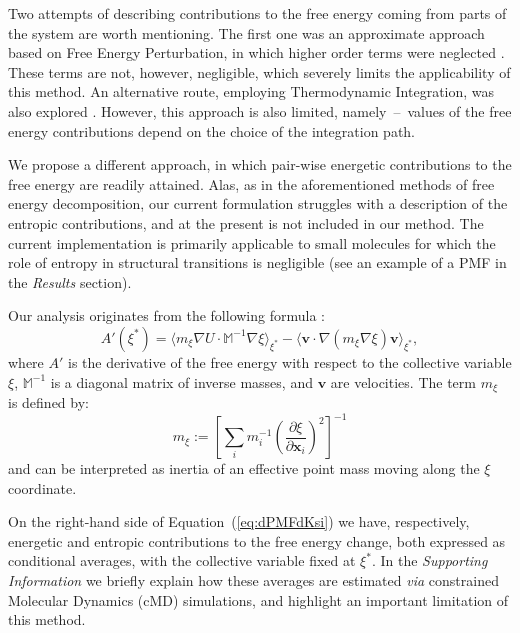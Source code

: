\documentclass[a4paper,11pt,twoside]{book}%
\begin{document}
Two attempts {\color{black}of describing contributions to the free energy coming from parts of the system} are worth mentioning.
The first one was an approximate approach based on Free Energy Perturbation, in which higher order terms were neglected \cite{brady1995decomposition}.
These terms are not, however, negligible, which severely limits the applicability of this method.
An alternative route, employing Thermodynamic Integration, was also explored \cite{boresch1995meaning}. 
However, this approach is also limited, namely~--~values of the free energy contributions depend on the choice of the integration path.

{\color{black}
We propose a different approach, in which pair-wise energetic contributions to the free energy are readily attained.
Alas, as in the aforementioned methods of free energy decomposition, our current formulation struggles with a description of the entropic contributions, and at the present is not included in our method.
The current implementation is primarily applicable to small molecules for which the role of entropy in structural transitions is negligible (see an example of a PMF in the \emph{Results} section).
}

Our analysis originates from the following formula \cite{carter1989constrained}:
\begin{equation}
\label{eq:dPMFdKsi}
A'(\xi^*)  =  \langle m_\xi \nabla U\cdot \mathbb{M}^{-1}\nabla\xi\rangle_{\xi^*}  - \langle \mathbf{v}\cdot\nabla(m_\xi\nabla\xi)\mathbf{v} \rangle_{\xi^*},
\end{equation}
where $A'$ is the derivative of the free energy with respect to the collective variable $\xi$, $\mathbb{M}^{-1}$ is a diagonal matrix of inverse masses, and $\mathbf{v}$ are velocities.
The term $m_\xi$ is defined by:
\begin{equation}
m_\xi := \left[ \sum_i m_i^{-1} \left(\frac{\partial\xi}{\partial\mathbf{x}_i}\right)^{2} \right]^{-1} 
\end{equation}
and can be interpreted as inertia of an effective point mass moving along the $\xi$ coordinate.

On the right-hand side of Equation~(\ref{eq:dPMFdKsi}) we have, respectively, energetic and entropic contributions to the free energy change, both expressed as conditional averages, with the collective variable fixed at $\xi^*$.
In the \emph{Supporting Information} we briefly explain how these averages are estimated \emph{via} constrained Molecular Dynamics (cMD) simulations, and highlight an important limitation of this method.
\end{document}

